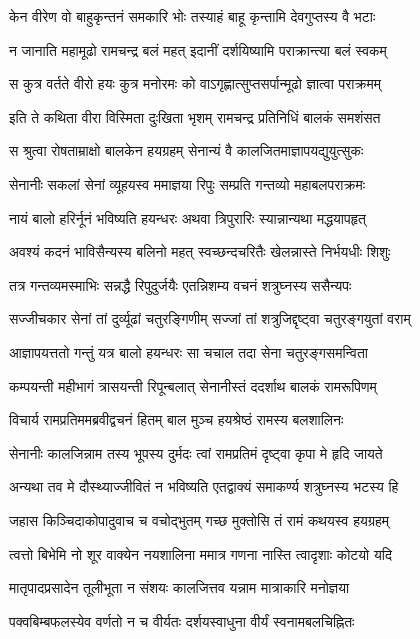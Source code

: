 \twolineshloka
{केन वीरेण वो बाहुकृन्तनं समकारि भोः}
{तस्याहं बाहू कृन्तामि देवगुप्तस्य वै भटाः}%

\twolineshloka
{न जानाति महामूढो रामचन्द्र बलं महत्}
{इदानीं दर्शयिष्यामि पराक्रान्त्या बलं स्वकम्}%

\twolineshloka
{स कुत्र वर्तते वीरो हयः कुत्र मनोरमः}
{को वाऽगृह्णात्सुप्तसर्पान्मूढो ज्ञात्वा पराक्रमम्}%

\twolineshloka
{इति ते कथिता वीरा विस्मिता दुःखिता भृशम्}
{रामचन्द्र प्रतिनिधिं बालकं समशंसत}%

\twolineshloka
{स श्रुत्वा रोषताम्राक्षो बालकेन हयग्रहम्}
{सेनान्यं वै कालजितमाज्ञापयद्युयुत्सुकः}%

\twolineshloka
{सेनानीः सकलां सेनां व्यूहयस्व ममाज्ञया}
{रिपुः सम्प्रति गन्तव्यो महाबलपराक्रमः}%

\twolineshloka
{नायं बालो हरिर्नूनं भविष्यति हयन्धरः}
{अथवा त्रिपुरारिः स्यान्नान्यथा मद्धयापहृत्}%

\twolineshloka
{अवश्यं कदनं भाविसैन्यस्य बलिनो महत्}
{स्वच्छन्दचरितैः खेलन्नास्ते निर्भयधीः शिशुः}%

\twolineshloka
{तत्र गन्तव्यमस्माभिः सन्नद्धै रिपुदुर्जयैः}
{एतन्निशम्य वचनं शत्रुघ्नस्य ससैन्यपः}%

\twolineshloka
{सज्जीचकार सेनां तां दुर्व्यूढां चतुरङ्गिणीम्}
{सज्जां तां शत्रुजिद्दृष्ट्वा चतुरङ्गयुतां वराम्}%

\twolineshloka
{आज्ञापयत्ततो गन्तुं यत्र बालो हयन्धरः}
{सा चचाल तदा सेना चतुरङ्गसमन्विता}%

\twolineshloka
{कम्पयन्ती महीभागं त्रासयन्ती रिपून्बलात्}
{सेनानीस्तं ददर्शाथ बालकं रामरूपिणम्}%

\twolineshloka
{विचार्य रामप्रतिममब्रवीद्वचनं हितम्}
{बाल मुञ्च हयश्रेष्ठं रामस्य बलशालिनः}%

\twolineshloka
{सेनानीः कालजिन्नाम तस्य भूपस्य दुर्मदः}
{त्वां रामप्रतिमं दृष्ट्वा कृपा मे हृदि जायते}%

\twolineshloka
{अन्यथा तव मे दौस्थ्याज्जीवितं न भविष्यति}
{एतद्वाक्यं समाकर्ण्य शत्रुघ्नस्य भटस्य हि}%

\twolineshloka
{जहास किञ्चिदाकोपादुवाच च वचोद्भुतम्}
{गच्छ मुक्तोसि तं रामं कथयस्व हयग्रहम्}%

\twolineshloka
{त्वत्तो बिभेमि नो शूर वाक्येन नयशालिना}
{ममात्र गणना नास्ति त्वादृशाः कोटयो यदि}%

\twolineshloka
{मातृपादप्रसादेन तूलीभूता न संशयः}
{कालजित्तव यन्नाम मात्राकारि मनोज्ञया}%

\twolineshloka
{पक्वबिम्बफलस्येव वर्णतो न च वीर्यतः}
{दर्शयस्वाधुना वीर्यं स्वनामबलचिह्नितः}%

